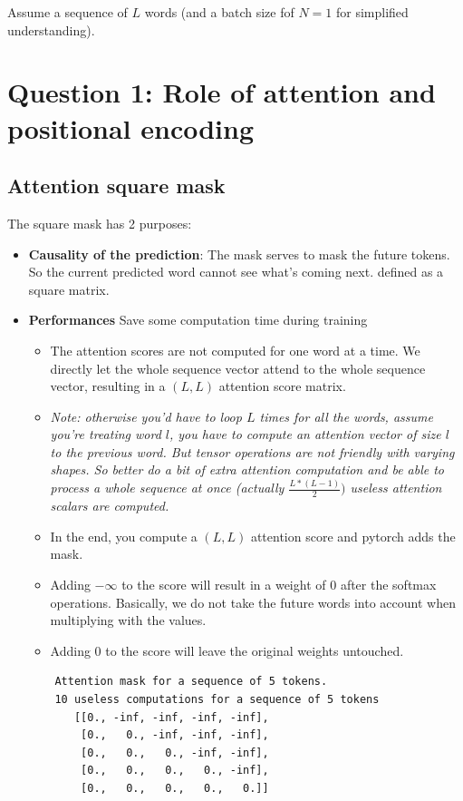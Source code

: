 \documentclass[a4paper]{article}
\begin{document}

Assume a sequence of $L$ words (and a batch size fof $N=1$ for simplified understanding).
\section{Question 1: Role of attention and positional encoding}
\subsection*{Attention square mask}
The square mask has 2 purposes:
\begin{itemize}
\item \textbf{Causality of the prediction}: The mask serves to mask the future tokens. So the current predicted word cannot see what's coming next.
defined as a square matrix.
\item \textbf{Performances} Save some computation time during training
    \begin{itemize} 
        \item The attention scores are not computed for one word at a time. We directly let the whole sequence vector attend to the whole sequence vector, resulting
    in a $(L, L)$ attention score matrix.
        \item \textit{Note: otherwise you'd have to loop $L$ times for all the words, assume you're treating  word $l$, you have to compute an attention vector of size $l$ to the previous word.
        But tensor operations are not friendly with varying shapes. So better do a bit of extra attention computation and be able to process a whole sequence at once (actually $\frac{L*(L-1)}{2})$ useless attention scalars are computed.} 
        \item In the end, you compute a $(L,L)$ attention score and pytorch adds the mask.
        \item Adding $-\infty$ to the score will result in a weight of $0$ after the softmax operations. Basically, we do not take the future words into account when multiplying with the values.
        \item Adding $0$ to the score will leave the original weights untouched.
    \end{itemize} 


\begin{verbatim}
    Attention mask for a sequence of 5 tokens.
    10 useless computations for a sequence of 5 tokens
       [[0., -inf, -inf, -inf, -inf],
        [0.,   0., -inf, -inf, -inf],
        [0.,   0.,   0., -inf, -inf],
        [0.,   0.,   0.,   0., -inf],
        [0.,   0.,   0.,   0.,   0.]]
\end{verbatim}
\end{itemize} 
\end{document}
